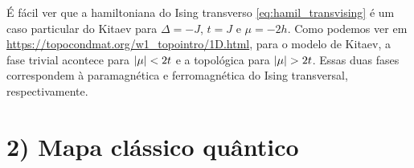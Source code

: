 \documentclass[a4paper,10pt]{article}
\begin{document}
É fácil ver que a hamiltoniana do Ising transverso \ref{eq:hamil_transvising} é um caso particular do Kitaev para $\Delta = -J$, $t = J$ e $\mu = -2h$. Como podemos ver em \url{https://topocondmat.org/w1_topointro/1D.html}, para o modelo de Kitaev, a fase trivial acontece para $\abs{\mu} < 2t$ e a topológica para $\abs{\mu} > 2t$. Essas duas fases correspondem à paramagnética e ferromagnética do Ising transversal, respectivamente.

\n\n

\section*{2) Mapa clássico quântico}




%


\end{document}
